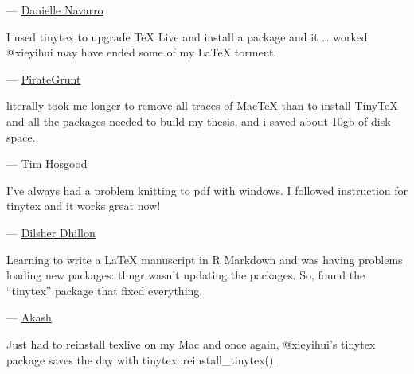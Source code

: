 \documentclass[
  xelatex,ja=standard,jafont=noto]{bxjsreport}
\renewenvironment{quote}{\def\FrameCommand{{\color{quotebarcolor}{\vrule width 3pt}}\hspace{10pt}}\MakeFramed{\advance\hsize-\width\FrameRestore}}{\endMakeFramed}
\begin{document}
\begin{quote}
---
\href{https://twitter.com/djnavarro/status/1112687238196822016}{Danielle
Navarro}
\end{quote}

\begin{quote}
I used tinytex to upgrade TeX Live and install a package and it \ldots{}
worked. @xieyihui may have ended some of my LaTeX torment.
\end{quote}

\begin{quote}
---
\href{https://twitter.com/FanninQED/status/1146857305285242880}{PirateGrunt}
\end{quote}

\begin{quote}
literally took me longer to remove all traces of MacTeX than to install
TinyTeX and all the packages needed to build my thesis, and i saved
about 10gb of disk space.
\end{quote}

\begin{quote}
--- \href{https://twitter.com/tjohnhos/status/1175575859748638720}{Tim
Hosgood}
\end{quote}

\begin{quote}
I've always had a problem knitting to pdf with windows. I followed
instruction for tinytex and it works great now!
\end{quote}

\begin{quote}
---
\href{https://twitter.com/TexanDhillon/status/1183831526485712897}{Dilsher
Dhillon}
\end{quote}

\begin{quote}
Learning to write a LaTeX manuscript in R Markdown and was having
problems loading new packages: tlmgr wasn't updating the packages. So,
found the ``tinytex'' package that fixed everything.
\end{quote}

\begin{quote}
---
\href{https://twitter.com/dynamic_choice/status/1203389695419224064}{Akash}
\end{quote}

\begin{quote}
Just had to reinstall texlive on my Mac and once again, @xieyihui's
tinytex package saves the day with tinytex::reinstall\_tinytex().
\end{quote}
\end{document}
